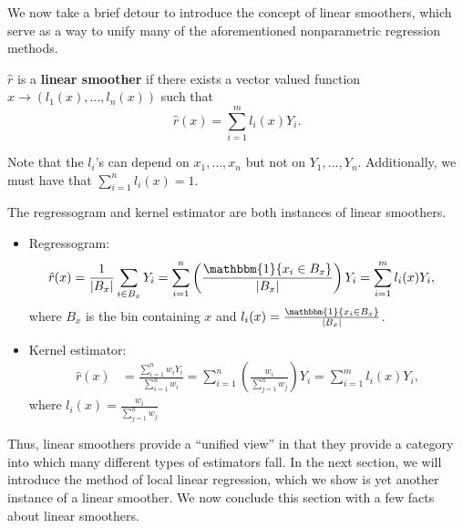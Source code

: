 We now take a brief detour to introduce the concept of linear smoothers, which serve as a way to unify many of the aforementioned nonparametric regression methods.
\begin{definition}
	$\hat r$ is a \textbf{linear smoother} if there exists a vector valued function $x \longrightarrow (l_1(x), \ldots, l_n(x))$ such that 
	\begin{equation}
		\hat r(x) = \sum_{i=1}^m l_i(x)Y_i.
	\end{equation}
\end{definition} 
Note that the $l_i$'s can depend on $x_1, \ldots, x_n$ but not on $Y_1, \ldots, Y_n$. Additionally, we must have that $\sum_{i=1}^n l_i(x) = 1$.
\begin{prop} 
	The regressogram and kernel estimator are both instances of linear smoothers. 
	\begin{itemize}
		\item Regressogram:
		\begin{align}
			\hat r(x) &= \frac{1}{|B_x|}\sum_{i \in B_x} Y_i = \sum_{i=1}^n \left(\frac{\mathbbm{1}\{x_i \in B_x \}}{|B_x|}\right) Y_i = \sum_{i=1}^m l_i(x)Y_i,
		\end{align}
		where $B_x$ is the bin containing $x$ and $l_i(x) = \frac{\mathbbm{1}\{x_i \in B_x\}}{|B_x|}$.
		\item Kernel estimator:
		\begin{align}
			\hat r(x) &= \frac{\sum_{i=1}^n w_i Y_i}{\sum_{i=1}^n w_i} = \sum_{i=1}^n \left(\frac{w_i}{\sum_{j=1}^n w_j}\right)Y_i = \sum_{i=1}^m l_i(x)Y_i,
		\end{align}
		where $l_i(x) = \frac{w_i}{\sum_{j=1}^n w_j}$
	\end{itemize}
\end{prop}
Thus, linear smoothers provide a ``unified view'' in that they provide a category into which many different types of estimators fall. In the next section, we will introduce the method of local linear regression, which we show is yet another instance of a linear smoother. We now conclude this section with a few facts about linear smoothers. 
